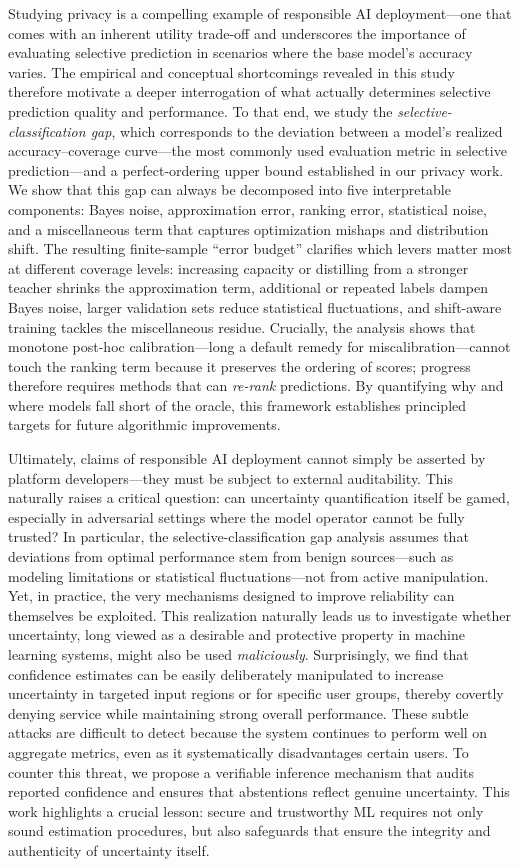 Studying privacy is a compelling example of responsible AI deployment—one that comes with an inherent utility trade-off and underscores the importance of evaluating selective prediction in scenarios where the base model's accuracy varies. The empirical and conceptual shortcomings revealed in this study therefore motivate a deeper interrogation of what actually determines selective prediction quality and performance. To that end, we study the \emph{selective-classification gap}, which corresponds to the deviation between a model's realized accuracy–coverage curve---the most commonly used evaluation metric in selective prediction---and a perfect-ordering upper bound established in our privacy work. We show that this gap can always be decomposed into five interpretable components: Bayes noise, approximation error, ranking error, statistical noise, and a miscellaneous term that captures optimization mishaps and distribution shift. The resulting finite-sample “error budget” clarifies which levers matter most at different coverage levels: increasing capacity or distilling from a stronger teacher shrinks the approximation term, additional or repeated labels dampen Bayes noise, larger validation sets reduce statistical fluctuations, and shift-aware training tackles the miscellaneous residue. Crucially, the analysis shows that monotone post-hoc calibration—long a default remedy for miscalibration—cannot touch the ranking term because it preserves the ordering of scores; progress therefore requires methods that can \emph{re-rank} predictions. By quantifying why and where models fall short of the oracle, this framework establishes principled targets for future algorithmic improvements.

Ultimately, claims of responsible AI deployment cannot simply be asserted by platform developers—they must be subject to external auditability. This naturally raises a critical question: can uncertainty quantification itself be gamed, especially in adversarial settings where the model operator cannot be fully trusted? In particular, the selective-classification gap analysis assumes that deviations from optimal performance stem from benign sources—such as modeling limitations or statistical fluctuations—not from active manipulation. Yet, in practice, the very mechanisms designed to improve reliability can themselves be exploited. This realization naturally leads us to investigate whether uncertainty, long viewed as a desirable and protective property in machine learning systems, might also be used \emph{maliciously}. Surprisingly, we find that confidence estimates can be easily deliberately manipulated to increase uncertainty in targeted input regions or for specific user groups, thereby covertly denying service while maintaining strong overall performance. These subtle attacks are difficult to detect because the system continues to perform well on aggregate metrics, even as it systematically disadvantages certain users. To counter this threat, we propose a verifiable inference mechanism that audits reported confidence and ensures that abstentions reflect genuine uncertainty. This work highlights a crucial lesson: secure and trustworthy ML requires not only sound estimation procedures, but also safeguards that ensure the integrity and authenticity of uncertainty itself.

